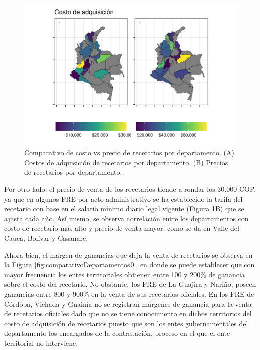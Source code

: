 \documentclass[
]{book}
\begin{document}
\begin{figure}

{\centering \includegraphics[width=0.9\linewidth]{InformeFinal_files/figure-latex/costoRecetario-1} 

}

\caption{Comparativo de costo vs precio de recetarios por departamento. (A) Costos de adquisición de recetarios por departamento. (B) Precios de recetarios por departamento.}\label{fig:costoRecetario}
\end{figure}

Por otro lado, el precio de venta de los recetarios tiende a rondar los 30.000 COP, ya que en algunos FRE por acto administrativo se ha establecido la tarifa del recetario con base en el salario mínimo diario legal vigente (Figura \ref{fig:costoRecetario}B) que se ajusta cada año. Así mismo, se observa correlación entre los departamentos con costo de recetario más alto y precio de venta mayor, como se da en Valle del Cauca, Bolívar y Casanare.

Ahora bien, el margen de ganancias que deja la venta de recetarios se observa en la Figura \ref{fig:comparativoDepartamentos0}, en donde se puede establecer que con mayor frecuencia los entes territoriales obtienen entre 100 y 200\% de ganancia sobre el costo del recetario. No obstante, los FRE de La Guajira y Nariño, poseen ganancias entre 800 y 900\% en la venta de sus recetarios oficiales. En los FRE de Córdoba, Vichada y Guainía no se registran márgenes de ganancia para la venta de recetarios oficiales dado que no se tiene conocimiento en dichos territorios del costo de adquisición de recetarios puesto que son los entes gubernamentales del departamento los encargados de la contratación, proceso en el que el ente territorial no interviene.
\end{document}
